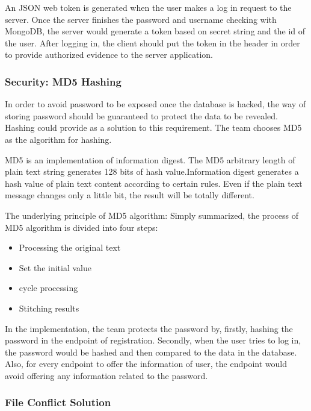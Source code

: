 \documentclass{article}
\begin{document}
An JSON web token is generated when the user makes a log in request to the server. Once the server finishes the password and username checking with MongoDB, the server would generate a token based on secret string and the id of the user. After logging in, the client should put the token in the header in order to provide authorized evidence to the server application. 

\subsubsection{Security: MD5 Hashing}

In order to avoid password to be exposed once the database is hacked, the way of storing password should be guaranteed to protect the data to be revealed. Hashing could provide as a solution to this requirement. The team chooses MD5 as the algorithm for hashing. 

 MD5 is an implementation of information digest. The MD5 arbitrary length of plain text string generates 128 bits of hash value.Information digest generates a hash value of plain text content according to certain rules. Even if the plain text message changes only a little bit, the result will be totally different.

The underlying principle of MD5 algorithm:
Simply summarized, the process of MD5 algorithm is divided into four steps: 
\begin{itemize}
 
\item Processing the original text
\item Set the initial value
\item cycle processing
\item Stitching results

\end{itemize}

In the implementation, the team protects the password by, firstly, hashing the password in the endpoint of registration. Secondly, when the user tries to log in, the password would be hashed and then compared to the data in the database. Also, for every endpoint to offer the information of user, the endpoint would avoid offering any information related to the password.

\subsubsection{File Conflict Solution}
\end{document}
